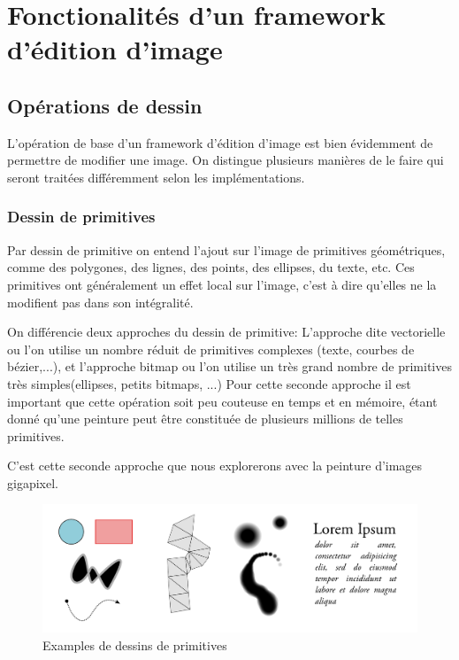 	\section{Fonctionalités d'un framework d'édition d'image}
		\subsection{Opérations de dessin}
			L'opération de base d'un framework d'édition d'image est bien évidemment de permettre de 
			modifier une image. On distingue plusieurs manières de le faire qui seront traitées différemment
			selon les implémentations.
			\subsubsection{Dessin de primitives}
				Par dessin de primitive on entend l'ajout sur l'image de primitives géométriques, comme
				des polygones, des lignes, des points, des ellipses, du texte, etc. Ces primitives ont généralement un 
				effet local sur l'image, c'est à dire qu'elles ne la modifient pas dans son intégralité. 

				On différencie deux approches du dessin de primitive: L'approche dite vectorielle ou l'on utilise un 
				nombre réduit de primitives complexes (texte, courbes de bézier,...), et l'approche bitmap ou l'on utilise
				un très grand nombre de primitives très simples(ellipses, petits bitmaps, ...) Pour cette seconde approche
				il est important que cette opération soit peu couteuse en temps et en mémoire, étant donné qu'une peinture
				peut être constituée de plusieurs millions de telles primitives. 

				C'est cette seconde approche que nous explorerons avec la peinture d'images gigapixel.

				\begin{figure}[h]
					\centering
					\includegraphics[width=\textwidth]{images/primitives}
					\caption{Examples de dessins de primitives}
					\label{fig:primitives}
				\end{figure}
